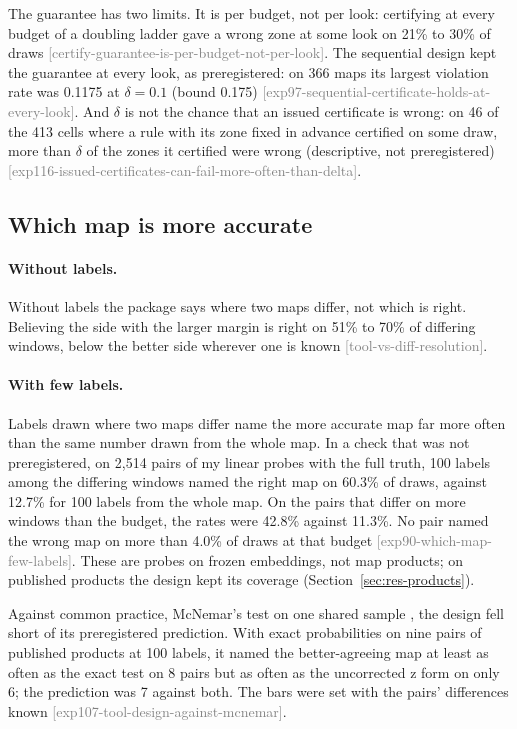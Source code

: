 \documentclass[11pt,a4paper]{article}
\newcommand{\claim}[1]{{\scriptsize\textsf{\textcolor{gray}{[#1]}}}}
\begin{document}
The guarantee has two limits. It is per budget, not per look: certifying at every budget of a doubling ladder gave a
wrong zone at some look on 21\% to 30\% of draws \claim{certify-guarantee-is-per-budget-not-per-look}. The sequential
design kept the guarantee at every look, as preregistered: on 366 maps its largest violation rate was 0.1175 at
$\delta = 0.1$ (bound 0.175) \claim{exp97-sequential-certificate-holds-at-every-look}. And $\delta$ is not the chance
that an issued certificate is wrong: on 46 of the 413 cells where a rule with its zone fixed in advance certified on
some draw, more than $\delta$ of the zones it certified were wrong (descriptive, not preregistered)
\claim{exp116-issued-certificates-can-fail-more-often-than-delta}.

\subsection{Which map is more accurate}
\label{sec:res-whichmap}

\paragraph{Without labels.}
\label{sec:res-compare}
Without labels the package says where two maps differ, not which is right. Believing the side with the larger margin
is right on 51\% to 70\% of differing windows, below the better side wherever one is known
\claim{tool-vs-diff-resolution}.

\paragraph{With few labels.}
Labels drawn where two maps differ name the more accurate map far more often than the same number drawn from the
whole map. In a check that was not preregistered, on 2,514 pairs of my linear probes with the full truth, 100 labels
among the differing windows named the right map on 60.3\% of draws, against 12.7\% for 100 labels from the whole map.
On the pairs that differ on more windows than the budget, the rates were 42.8\% against 11.3\%. No pair named the
wrong map on more than 4.0\% of draws at that budget \claim{exp90-which-map-few-labels}. These are probes on frozen
embeddings, not map products; on published products the design kept its coverage (Section~\ref{sec:res-products}).

Against common practice, McNemar's test on one shared sample \citep{foody2004}, the design fell short of its
preregistered prediction. With exact probabilities on nine pairs of published products at 100 labels, it named the
better-agreeing map at least as often as the exact test on 8 pairs but as often as the uncorrected z form on only 6;
the prediction was 7 against both. The bars were set with the pairs' differences known
\claim{exp107-tool-design-against-mcnemar}.
\end{document}
